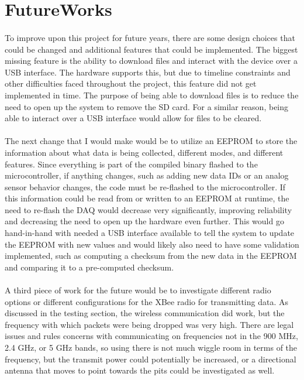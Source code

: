 \section{FutureWorks}

\paragraph{}
To improve upon this project for future years, there are some design choices that could be changed and additional features that could be implemented.
The biggest missing feature is the ability to download files and interact with the device over a USB interface.
The hardware supports this, but due to timeline constraints and other difficulties faced throughout the project, this feature did not get implemented in time.
The purpose of being able to download files is to reduce the need to open up the system to remove the SD card.
For a similar reason, being able to interact over a USB interface would allow for files to be cleared.

\paragraph{}
The next change that I would make would be to utilize an EEPROM to store the information about what data is being collected, different modes, and different features.
Since everything is part of the compiled binary flashed to the microcontroller, if anything changes, such as adding new data IDs or an analog sensor behavior changes, the code must be re-flashed to the microcontroller.
If this information could be read from or written to an EEPROM at runtime, the need to re-flash the DAQ would decrease very significantly, improving reliability and decreasing the need to open up the hardware even further.
This would go hand-in-hand with needed a USB interface available to tell the system to update the EEPROM with new values and would likely also need to have some validation implemented, such as computing a checksum from the new data in the EEPROM and comparing it to a pre-computed checksum.

\paragraph{}
A third piece of work for the future would be to investigate different radio options or different configurations for the XBee radio for transmitting data.
As discussed in the testing section, the wireless communication did work, but the frequency with which packets were being dropped was very high.
There are legal issues and rules concerns with communicating on frequencies not in the 900 MHz, 2.4 GHz, or 5 GHz bands, so using there is not much wiggle room in terms of the frequency, but the transmit power could potentially be increased, or a directional antenna that moves to point towards the pits could be investigated as well.

